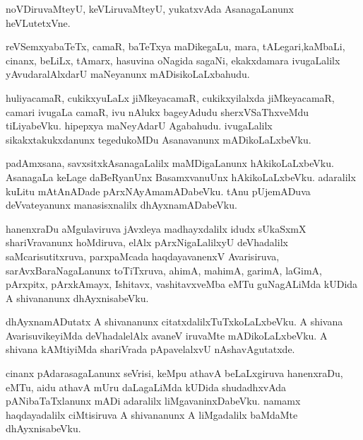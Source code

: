 \documentclass{article}
\begin{document}
\begin{mn}
noVDiruvaMteyU,  keVLiruvaMteyU,  yukatxvAda  AsanagaLanunx  heVLutetxVne.
\end{mn}

\begin{mn}
reVSemxyabaTeTx,  camaR,  baTeTxya  maDikegaLu,  mara,  tALegari,kaMbaLi,  cinanx,  beLiLx,  tAmarx,  
hasuvina  oNagida  sagaNi,  ekakxdamara  ivugaLalilx  yAvudaralAlxdarU  maNeyanunx  mADisikoLaLxbahudu.
\end{mn}

\begin{mn}
huliyacamaR,  cukikxyuLaLx  jiMkeyacamaR,  cukikxyilalxda  jiMkeyacamaR,  camari  ivugaLa  camaR,  
ivu  nAlukx  bageyAdudu  sherxVSaThxveMdu  tiLiyabeVku.  hipepxya  maNeyAdarU  Agabahudu.  ivugaLalilx  
sikakxtakukxdanunx  tegedukoMDu  Asanavanunx  mADikoLaLxbeVku.
\end{mn}

\begin{mn}
padAmxsana,  savxsitxkAsanagaLalilx  maMDigaLanunx  hAkikoLaLxbeVku.  AsanagaLa  keLage  daBeRyanUnx  
BasamxvanuUnx  hAkikoLaLxbeVku.  adaralilx  kuLitu  mAtAnADade  pArxNAyAmamADabeVku.  tAnu  pUjemADuva  
deVvateyanunx  manasisxnalilx  dhAyxnamADabeVku.
\end{mn}

\begin{mn}
hanenxraDu  aMgulaviruva  jAvxleya  madhayxdalilx  idudx  sUkaSxmX  shariVravanunx  hoMdiruva,  
elAlx  pArxNigaLalilxyU  deVhadalilx  saMcarisutitxruva,  parxpaMcada  haqdayavanenxV  Avarisiruva,  
sarAvxBaraNagaLanunx  toTiTxruva,  ahimA,  mahimA,  garimA,  laGimA,  pArxpitx,  pArxkAmayx,  Ishitavx,  
vashitavxveMba  eMTu  guNagALiMda  kUDida  A  shivananunx  dhAyxnisabeVku.
\end{mn}

\begin{mn}
dhAyxnamADutatx  A  shivananunx  citatxdalilxTuTxkoLaLxbeVku.  A  shivana  AvarisuvikeyiMda  deVhadalelAlx  
avaneV  iruvaMte  mADikoLaLxbeVku.  A  shivana  kAMtiyiMda  shariVrada  pApavelalxvU  nAshavAgutatxde.
\end{mn}

\begin{mn}
cinanx  pAdarasagaLanunx  seVrisi,  keMpu  athavA  beLaLxgiruva  hanenxraDu,  eMTu,  aidu  athavA  mUru  
daLagaLiMda  kUDida  shudadhxvAda  pANibaTaTxlanunx  mADi  adaralilx  liMgavaninxDabeVku.  namamx  
haqdayadalilx  ciMtisiruva  A  shivananunx  A  liMgadalilx  baMdaMte  dhAyxnisabeVku.
\end{mn}
\end{document}
